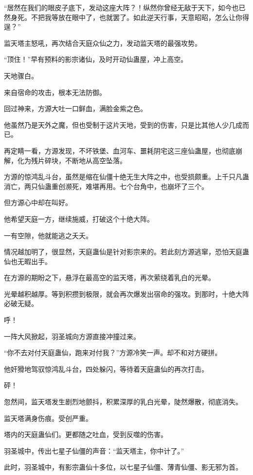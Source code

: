 
\begin{this_body}

“居然在我们的眼皮子底下，发动这座大阵？！纵然你曾经无敌于天下，如今也已然身死。不把我等放在眼中了，也就罢了。如此逆天行事，天意昭昭，怎么让你得逞？”

监天塔主怒吼，再次结合天庭众仙之力，发动监天塔的最强攻势。

“顶住！”早有预料的影宗诸仙，及时开动仙蛊屋，冲上高空。

天地骤白。

来自宿命的攻击，根本无法防御。

回过神来，方源大吐一口鲜血，满脸金紫之色。

他虽然乃是天外之魔，但也受制于这片天地，受到的伤害，只是比其他人少几成而已。

再定睛一看，方源发现，不坏铁堡、血河车、噩耗阴宅这三座仙蛊屋，也彻底崩解，化为残片碎块，不断地从高空坠落。

方源的惊鸿乱斗台，虽然是缩在仙僵十绝无生大阵之中，也受损颇重。上千只凡蛊消亡，两只仙蛊重创濒死，难堪再用。七个台角中，也崩坏了三个。

但方源心中却在叫好。

他希望天庭一方，继续施威，打破这个十绝大阵。

一有空隙，他就能逃之夭夭。

情况越加明了，很显然，天庭蛊仙是针对影宗来的。若此刻方源逃窜，恐怕天庭蛊仙也无暇出手。

在方源的期盼之下，悬浮在最高空的监天塔，再次萦绕着乳白的光晕。

光晕越积越厚。等到积攒到极限，就会再次爆发出宿命的强攻。到那时，十绝大阵必破无疑。

呼！

一阵大风掀起，羽圣城向方源直接冲撞过来。

“你不去对付天庭蛊仙，跑来对付我？”方源冷笑一声。却不和对方硬拼。

他奸猾地驾驭惊鸿乱斗台，四处躲闪，等待着天庭蛊仙的再次打击。

砰！

忽然间，监天塔发生剧烈地颤抖，积累深厚的乳白光晕，陡然爆散，彻底消失。

监天塔满身伤痕。受创严重。

塔内的天庭蛊仙们。更都随之吐血，受到反噬的伤害。

羽圣城中，传出七星子仙僵的声音：“监天塔主，你中计了。”

此时，羽圣城中，有影宗蛊仙十多位，以七星子仙僵、薄青仙僵、影无邪为首。


\end{this_body}
